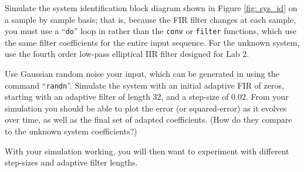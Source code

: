 
%
%
%
%
%

Simulate the system identification block diagram
shown in Figure \ref{fig: sys_id} on a sample
by sample basis; that is, because the FIR filter
changes at each sample, you must use a ``\verb+do+''
loop in \matlab rather than the \verb+conv+ or \verb+filter+
functions, which use the same filter coefficients for the
entire input sequence.  For the unknown system, use the
fourth order low-pass elliptical IIR filter designed for
Lab 2.

Use Gaussian random noise your input, which can
be generated in \matlab using the command ``\verb+randn+''.
Simulate the system with an initial adaptive FIR
of zeros, starting with an adaptive filter of
length 32, and a step-size of $0.02$.
From your simulation you should be able
to plot the error (or squared-error) as it
evolves over time, as well as the final
set of adapted coefficients.  (How do they compare
to the unknown system coefficients?)

With your simulation working, you will then want
to experiment with different step-sizes and
adaptive filter lengths.


